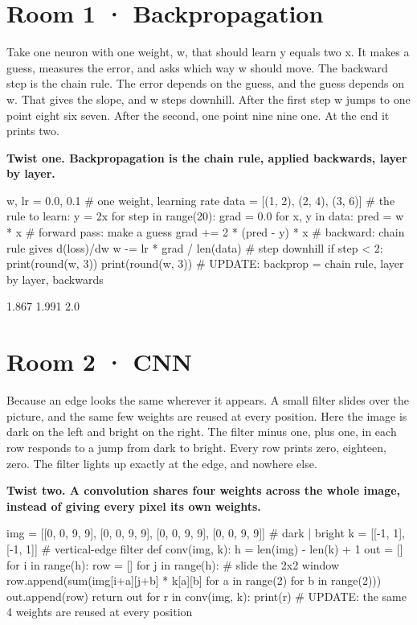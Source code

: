 \documentclass[11pt,a4paper]{report}
\begin{document}
\section*{Room 1 · Backpropagation}
Take one neuron with one weight, w, that should learn y equals two x. It makes a guess, measures the error, and asks which way w should move. The backward step is the chain rule. The error depends on the guess, and the guess depends on w. That gives the slope, and w steps downhill. After the first step w jumps to one point eight six seven. After the second, one point nine nine one. At the end it prints two.
\begin{tcolorbox}[colback=yellow!12,colframe=orange!70!black,boxrule=0.4pt,left=4pt,right=4pt,top=2pt,bottom=2pt]\textbf{Twist one. Backpropagation is the chain rule, applied backwards, layer by layer.}\end{tcolorbox}
\begin{Code}
w, lr = 0.0, 0.1                            # one weight, learning rate
data = [(1, 2), (2, 4), (3, 6)]             # the rule to learn: y = 2x
for step in range(20):
    grad = 0.0
    for x, y in data:
        pred = w * x                        # forward pass: make a guess
        grad += 2 * (pred - y) * x          # backward: chain rule gives d(loss)/dw
    w -= lr * grad / len(data)              # step downhill
    if step < 2: print(round(w, 3))
print(round(w, 3))
# UPDATE: backprop = chain rule, layer by layer, backwards
\end{Code}
\begin{Out}
1.867
1.991
2.0
\end{Out}
\section*{Room 2 · CNN}
Because an edge looks the same wherever it appears. A small filter slides over the picture, and the same few weights are reused at every position. Here the image is dark on the left and bright on the right. The filter minus one, plus one, in each row responds to a jump from dark to bright. Every row prints zero, eighteen, zero. The filter lights up exactly at the edge, and nowhere else.
\begin{tcolorbox}[colback=yellow!12,colframe=orange!70!black,boxrule=0.4pt,left=4pt,right=4pt,top=2pt,bottom=2pt]\textbf{Twist two. A convolution shares four weights across the whole image, instead of giving every pixel its own weights.}\end{tcolorbox}
\begin{Code}
img = [[0, 0, 9, 9], [0, 0, 9, 9], [0, 0, 9, 9], [0, 0, 9, 9]]   # dark | bright
k = [[-1, 1], [-1, 1]]                      # vertical-edge filter
def conv(img, k):
    h = len(img) - len(k) + 1
    out = []
    for i in range(h):
        row = []
        for j in range(h):                  # slide the 2x2 window
            row.append(sum(img[i+a][j+b] * k[a][b] for a in range(2) for b in range(2)))
        out.append(row)
    return out
for r in conv(img, k): print(r)
# UPDATE: the same 4 weights are reused at every position
\end{Code}
\begin{Out}
[0, 18, 0]
[0, 18, 0]
[0, 18, 0]
\end{Out}
\end{document}

